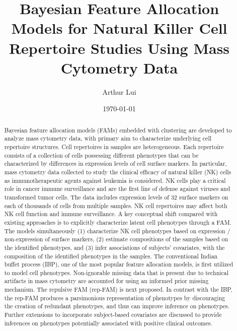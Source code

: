\documentclass[12pt,]{article}
\title{Bayesian Feature Allocation Models for Natural Killer Cell Repertoire Studies Using Mass Cytometry Data}
\author{Arthur Lui}
\date{\today}
\begin{document}
\maketitle
\onehalfspacing



\begin{abstract}
\noindent
Bayesian feature allocation models (FAMs) embedded with
clustering are developed to analyze mass cytometry data, with primary aim to
characterize underlying cell repertoire structures.   Cell repertoires in
samples are heterogeneous. Each repertoire consists of a collection of cells
possessing different phenotypes that can be characterized by differences in
expression levels of cell surface markers.  In particular, mass cytometry data
collected to study the clinical efficacy of natural killer (NK) cells as
immunotherapeutic agents against leukemia is considered. NK cells play a
critical role in cancer immune surveillance and are the first line of defense
against viruses and transformed tumor cells.  The data includes expression
levels of 32 surface markers on each of thousands of cells from multiple
samples. NK cell repertoires may affect both NK cell function and immune
surveillance.  A key conceptual shift compared with existing approaches is to
explicitly characterize latent cell phenotypes through a FAM.  The models
simultaneously (1) characterize NK cell phenotypes based on expression /
non-expression of surface markers, (2) estimate compositions of the samples
based on the identified phenotypes, and (3) infer associations of subjects'
covariates, with the composition of the identified phenotypes in the samples.
The conventional Indian buffet process (IBP), one of the most popular feature
allocation models, is first utilized to model cell phenotypes. Non-ignorable
missing data that is present due to technical artifacts in mass cytometry are
accounted for using an informed prior missing mechanism. The repulsive FAM
(rep-FAM) is next proposed.  In contrast with the IBP, the rep-FAM produces a
parsimonious representation of phenotypes by discouraging the creation of
redundant phenotypes, and thus can improve inference on phenotypes.  Further
extensions to incorporate subject-based covariates are discussed to provide
inferences on phenotypes potentially associated with positive clinical
outcomes.  

\end{abstract}
\end{document}
